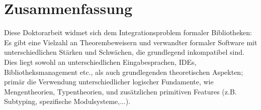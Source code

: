 \newpage
\section*{Zusammenfassung}

Diese Doktorarbeit widmet sich dem Integrationsproblem formaler Bibliotheken: Es gibt eine Vielzahl an Theorembeweisern und verwandter formaler Software mit unterschiedlichen Stärken und Schwächen, die grundlegend inkompatibel sind. Dies liegt sowohl an unterschiedlichen Eingabesprachen, IDEs, Bibliotheksmanagement etc., als auch grundlegenden theoretischen Aspekten; primär die Verwendung unterschiedlicher logischer Fundamente, wie Mengentheorien, Typentheorien, und zusätzlichen primitiven Features (z.B. Subtyping, spezifische Modulsysteme,...). %

